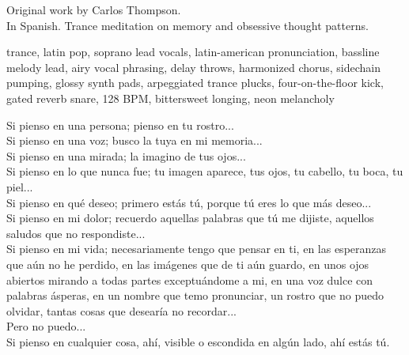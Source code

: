 

\begin{notes}
Original work by Carlos Thompson.\\
In Spanish. %
Trance meditation on memory and obsessive thought patterns.
\end{notes}

\begin{style}
trance, latin pop, soprano lead vocals, latin-american pronunciation, bassline melody lead, airy vocal phrasing, delay throws, harmonized chorus, sidechain pumping, glossy synth pads, arpeggiated trance plucks, four-on-the-floor kick, gated reverb snare, 128 BPM, bittersweet longing, neon melancholy
\end{style}

\begin{lyrics}
Si pienso en una persona; pienso en tu rostro...\\
Si pienso en una voz; busco la tuya en mi memoria...\\
Si pienso en una mirada; la imagino de tus ojos...\\
Si pienso en lo que nunca fue; tu imagen aparece, tus ojos, tu cabello, tu boca, tu piel...\\
Si pienso en qué deseo; primero estás tú, porque tú eres lo que más deseo...\\
Si pienso en mi dolor; recuerdo aquellas palabras que tú me dijiste, aquellos saludos que no respondiste...\\
Si pienso en mi vida; necesariamente tengo que pensar en ti, en las esperanzas que aún no he perdido, en las imágenes que de ti aún guardo, en unos ojos abiertos mirando a todas partes exceptuándome a mi, en una voz dulce con palabras ásperas, en un nombre que temo pronunciar, un rostro que no puedo olvidar, tantas cosas que desearía no recordar...\\
Pero no puedo...\\
Si pienso en cualquier cosa, ahí, visible o escondida en algún lado, ahí estás tú.
\end{lyrics}

